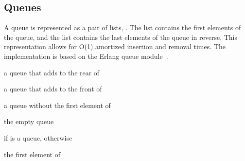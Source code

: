 \subsection {Queues}

A queue is represented as a pair of lists,
. The  list contains the first
elements of the queue, and the  list contains the last
elements of the queue in reverse. This representation allows for O(1)
amortized insertion and removal times. The implementation is based on
the Erlang queue module~\cite{queue-ref}.

\begin{procedure}
\end{procedure}
\returns{} a queue that adds  to the rear of 

\begin{procedure}
\end{procedure}
\returns{} a queue that adds  to the front of 

\begin{procedure}
\end{procedure}
\returns{} a queue without the first element of 

\begin{syntax}
\end{syntax}
\returns{} the empty queue

\begin{procedure}
\end{procedure}
\returns{}  if  is a queue,  otherwise

\begin{procedure}
\end{procedure}
\returns{} the first element of 

